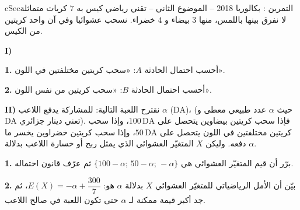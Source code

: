 \documentclass[12pt,a4paper]{article}
\newenvironment{BOX}[2]{\begin{otherlanguage}{english}\begin{arbox}{#1}{#2}}{\end{arbox}\end{otherlanguage}}
\newcounter{exo}
\newenvironment{tamrin}[1]{\stepcounter{exo}\begin{BOX}{cSec}{التمرين \theexo: #1}}{\end{BOX}}
\newcommand{\QQ}[1]{\par\smallskip\textbf{#1.} }
\begin{document}
\begin{tamrin}{بكالوريا 2018 -- الموضوع الثاني -- تقني رياضي}
كيس به $7$ كريات متماثلة لا نفرق بينها باللمس، منها $3$ بيضاء و $4$ خضراء. نسحب عشوائيا وفي آن واحد كريتين من الكيس.

\textbf{I)}
\QQ{1} أحسب احتمال الحادثة $A$: «سحب كريتين مختلفتين في اللون».
\QQ{2} أحسب احتمال الحادثة $B$: «سحب كريتين من نفس اللون».

\textbf{II)} نقترح اللعبة التالية: للمشاركة يدفع اللاعب $\alpha$ (DA)، (حيث $\alpha$ عدد طبيعي معطى و DA تعني دينار جزائري).
فإذا سحب كريتين بيضاوين يتحصل على $100\,\text{DA}$، وإذا سحب كريتين مختلفتين في اللون يتحصل على $50\,\text{DA}$، وإذا سحب كريتين خضراوين يخسر ما دفعه. وليكن $X$ المتغيّر العشوائي الذي يمثل ربح أو خسارة اللاعب بدلالة $\alpha$.
\QQ{1} برّر أن قيم المتغيّر العشوائي هي $\{100-\alpha;\,50-\alpha;\,-\alpha\}$ ثم عرّف قانون احتماله.
\QQ{2} بيّن أن الأمل الرياضياتي للمتغيّر العشوائي $X$ بدلالة $\alpha$ هو: $E(X)=-\alpha+\dfrac{300}{7}$، ثم جد أكبر قيمة ممكنة لـ $\alpha$ حتى تكون اللعبة في صالح اللاعب.
\end{tamrin}
\end{document}
